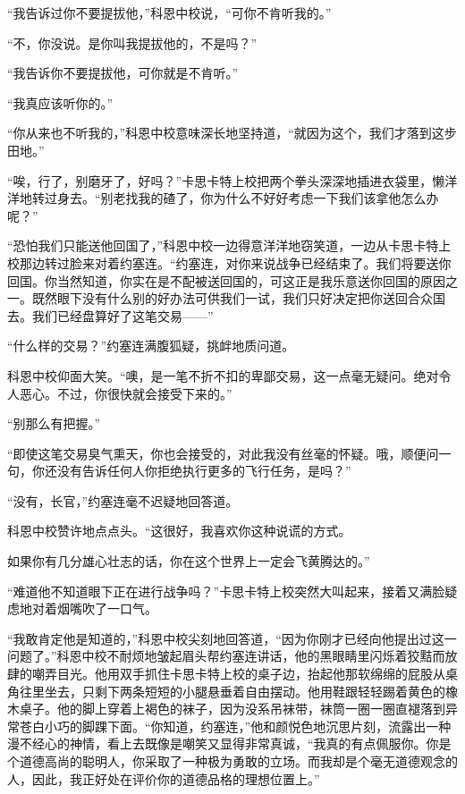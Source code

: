     “我告诉过你不要提拔他，”科恩中校说，“可你不肯听我的。”

    “不，你没说。是你叫我提拔他的，不是吗？”

    “我告诉你不要提拔他，可你就是不肯听。”

    “我真应该听你的。”

    “你从来也不听我的，”科恩中校意味深长地坚持道，“就因为这个，我们才落到这步田地。”

    “唉，行了，别磨牙了，好吗？”卡思卡特上校把两个拳头深深地插进衣袋里，懒洋洋地转过身去。“别老找我的碴了，你为什么不好好考虑一下我们该拿他怎么办呢？”

    “恐怕我们只能送他回国了，”科恩中校一边得意洋洋地窃笑道，一边从卡思卡特上校那边转过脸来对着约塞连。“约塞连，对你来说战争已经结束了。我们将要送你回国。你当然知道，你实在是不配被送回国的，可这正是我乐意送你回国的原因之一。既然眼下没有什么别的好办法可供我们一试，我们只好决定把你送回合众国去。我们已经盘算好了这笔交易——”

    “什么样的交易？”约塞连满腹狐疑，挑衅地质问道。

    科恩中校仰面大笑。“噢，是一笔不折不扣的卑鄙交易，这一点毫无疑问。绝对令人恶心。不过，你很快就会接受下来的。”

    “别那么有把握。”

    “即使这笔交易臭气熏天，你也会接受的，对此我没有丝毫的怀疑。哦，顺便问一句，你还没有告诉任何人你拒绝执行更多的飞行任务，是吗？”

    “没有，长官，”约塞连毫不迟疑地回答道。

    科恩中校赞许地点点头。“这很好，我喜欢你这种说谎的方式。

    如果你有几分雄心壮志的话，你在这个世界上一定会飞黄腾达的。”

    “难道他不知道眼下正在进行战争吗？”卡思卡特上校突然大叫起来，接着又满脸疑虑地对着烟嘴吹了一口气。

    “我敢肯定他是知道的，”科恩中校尖刻地回答道，“因为你刚才已经向他提出过这一问题了。”科恩中校不耐烦地皱起眉头帮约塞连讲话，他的黑眼睛里闪烁着狡黠而放肆的嘲弄目光。他用双手抓住卡思卡特上校的桌子边，抬起他那软绵绵的屁股从桌角往里坐去，只剩下两条短短的小腿悬垂着自由摆动。他用鞋跟轻轻踢着黄色的橡木桌子。他的脚上穿着上褐色的袜子，因为没系吊袜带，袜筒一圈一圈直褪落到异常苍白小巧的脚踝下面。“你知道，约塞连，”他和颜悦色地沉思片刻，流露出一种漫不经心的神情，看上去既像是嘲笑又显得非常真诚，“我真的有点佩服你。你是个道德高尚的聪明人，你采取了一种极为勇敢的立场。而我却是个毫无道德观念的人，因此，我正好处在评价你的道德品格的理想位置上。”

